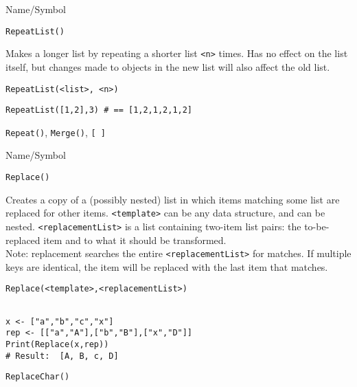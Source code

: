 \rl


\begin{desc}{Name/Symbol}
\item[Name/Symbol] 	\verb+RepeatList()+

\item[Description]  	Makes a longer list by repeating a shorter list \verb+<n>+ times. 
	Has no effect on the list itself, but changes made to objects 
	in the new list will also affect the old list.

\item[Usage]       	
\begin{verbatim}
RepeatList(<list>, <n>)
\end{verbatim}

\item[Example]     	
\begin{verbatim}
RepeatList([1,2],3) # == [1,2,1,2,1,2]
\end{verbatim}

\item[See Also]    	\verb+Repeat()+, \verb+Merge()+, \verb+[ ]+
\end{desc}

\rl



\begin{desc}{Name/Symbol}
\item[Name/Symbol] \verb+Replace()+

\item[Description]  	Creates a copy of a (possibly nested) list in which
		items matching some list are replaced for other items.  
		\verb+<template>+ can be any data structure, and can be nested.  
		\verb+<replacementList>+ is a list containing two-item list pairs:
		the to-be-replaced item and to what it should be transformed.\\
		Note: replacement searches the entire \verb+<replacementList>+ for 
		matches.  If multiple keys are identical, the item will be 
		replaced with the last item that matches.

\item[Usage]        	
\begin{verbatim}
Replace(<template>,<replacementList>)
\end{verbatim}
			  
\item[Example]     	
\begin{verbatim}

x <- ["a","b","c","x"]
rep <- [["a","A"],["b","B"],["x","D"]]
Print(Replace(x,rep))
# Result:  [A, B, c, D] 
\end{verbatim}

\item[See Also]	
\verb+ReplaceChar()+
\end{desc}

